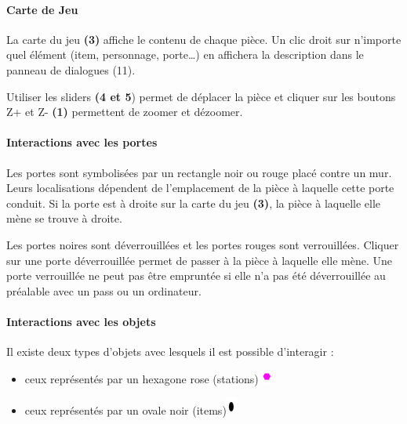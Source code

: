 \documentclass[./standalone.tex]{subfiles}
\begin{document}
\paragraph{Carte de Jeu\\}
    La carte du jeu \textbf{(3)} affiche le contenu de chaque pièce. Un clic droit sur n’importe quel élément (item, personnage, porte…) en affichera la description dans le panneau de dialogues (11).
\par Utiliser les sliders \textbf{(4 et 5}) permet de déplacer la pièce et cliquer sur les boutons Z+ et Z- \textbf{(1)} permettent de zoomer et dézoomer.

\paragraph{Interactions avec les portes\\}
    Les portes sont symbolisées par un rectangle noir ou rouge placé contre un mur. Leurs localisations dépendent de l’emplacement de la pièce à laquelle cette porte conduit. Si la porte est à droite sur la carte du jeu \textbf{(3)}, la pièce à laquelle elle mène se trouve à droite. 
\par Les portes noires sont déverrouillées et les portes rouges sont verrouillées. Cliquer sur une porte déverrouillée permet de passer à la pièce à laquelle elle mène. Une porte verrouillée ne peut pas être empruntée si elle n’a pas été déverrouillée au préalable avec un pass ou un ordinateur.
        
\paragraph{Interactions avec les objets\\}
    Il existe deux types d’objets avec lesquels il est possible d’interagir :
    \begin{itemize}
    	\item ceux représentés par un hexagone rose (stations) \includegraphics[scale=1]{images/hexagone.png}
    	\item ceux représentés par un ovale noir (items)\includegraphics[scale=1]{images/ellipse.png}
    \end{itemize}
            
\end{document}

